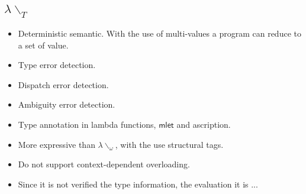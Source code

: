 \documentclass[preprint,authoryear,sort&compress,9pt,nocopyrightspace]{article}
\newcommand{\semanticC}{${\lambda}{\backslash}_\omega$}
\newcommand{\semanticD}{${\lambda}{\backslash}_T$}
\begin{document}
\subsection{\semanticD}
\begin{itemize}
\item Deterministic semantic. With the use of multi-values a program can reduce to a set of value.
\item Type error detection.
\item Dispatch error detection.
\item Ambiguity error detection.
\item Type annotation in lambda functions, $\mathsf{mlet}$ and ascription.
\item More expressive than \semanticC, with the use structural tags.
\item Do not support context-dependent overloading.
\item Since it is not verified the type information, the evaluation  it is ...
\end{itemize}
\end{document}
